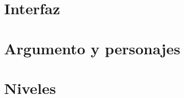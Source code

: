 \documentclass[a4paper,11pt,titlepage]{book}
\begin{document}
\chapter{Interfaz}
\label{chap:interfaz}


\chapter{Argumento y personajes}%
\label{chap:argumento}


\chapter{Niveles}
\label{chap:niveles}


%
%        
%        
%

\end{document}
